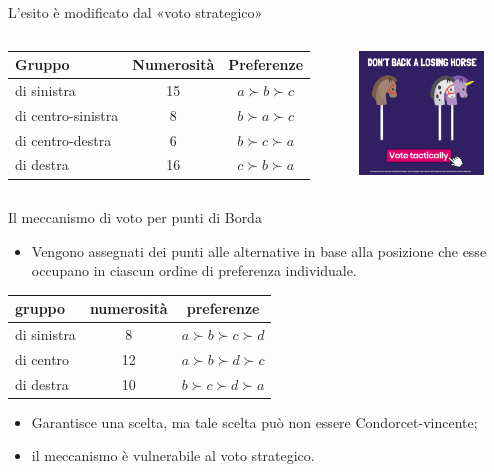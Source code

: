 \documentclass[aspectratio=64,12pt]{beamer}
\begin{document}
\begin{frame}{L'esito è modificato dal «voto strategico»}
\begin{columns}
\begin{column}{.7\columnwidth}
\begin{tabular}{lcc}\toprule
Gruppo & Numerosità &Preferenze\\
\midrule
di sinistra & 15 & $a \succ b \succ c$ \\
di centro-sinistra & 8 & $b \succ a \succ c$ \\
di centro-destra & 6 & $b \succ c \succ a$ \\
di destra & 16 & $c \succ b \succ a$ \\\bottomrule
\end{tabular}
\end{column}

\begin{column}{.3\columnwidth}
\begin{center}
\includegraphics[width=3.3cm]{./figure/vote-tactically.png}
\end{center}
\end{column}
\end{columns}
\end{frame}

\begin{frame}{Il meccanismo di voto per punti di Borda}
\begin{itemize}
\item Vengono assegnati dei punti alle alternative in base alla posizione che
  esse occupano in ciascun ordine di preferenza individuale.
\end{itemize}
\begin{center}
\begin{tabular}{lcc}\toprule
  gruppo & numerosità &preferenze\\
  \midrule
  di sinistra & 8 & $a \succ b \succ c\succ d$ \\
  di centro & 12 & $a \succ b \succ d\succ c$ \\
  di destra & 10 & $b \succ c \succ d\succ a$ \\\bottomrule
\end{tabular}
\end{center}

\begin{itemize}
\item Garantisce una scelta, ma tale scelta può non essere Condorcet-vincente;
\item il meccanismo è vulnerabile al voto strategico.
\end{itemize}
\end{frame}
\end{document}
